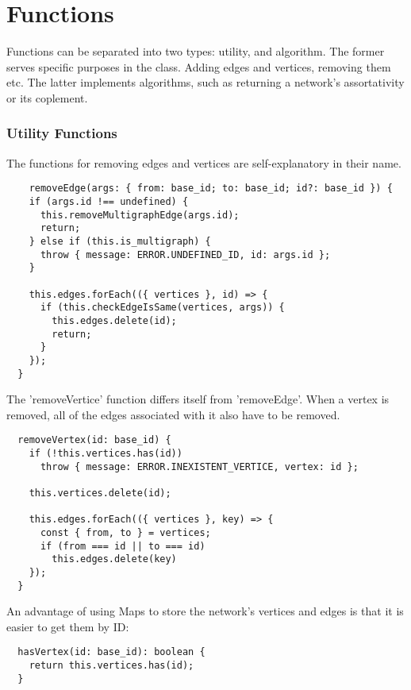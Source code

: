 \chapter{Functions}

Functions can be separated into two types: utility, and algorithm.
The former serves specific purposes in the class. Adding edges and vertices, removing them etc.
The latter implements algorithms, such as returning a network's assortativity or its coplement.

\subsection{Utility Functions}
The functions for removing edges and vertices are self-explanatory in their name.

\begin{verbatim}
    removeEdge(args: { from: base_id; to: base_id; id?: base_id }) {
    if (args.id !== undefined) {
      this.removeMultigraphEdge(args.id);
      return;
    } else if (this.is_multigraph) {
      throw { message: ERROR.UNDEFINED_ID, id: args.id };
    }

    this.edges.forEach(({ vertices }, id) => {
      if (this.checkEdgeIsSame(vertices, args)) {
        this.edges.delete(id);
        return;
      }
    });
  }
\end{verbatim}

The 'removeVertice' function differs itself from 'removeEdge'.
When a vertex is removed, all of the edges associated with it also have to be removed.

\begin{verbatim}
  removeVertex(id: base_id) {
    if (!this.vertices.has(id))
      throw { message: ERROR.INEXISTENT_VERTICE, vertex: id };

    this.vertices.delete(id);

    this.edges.forEach(({ vertices }, key) => {
      const { from, to } = vertices;
      if (from === id || to === id)
        this.edges.delete(key)
    });
  }
\end{verbatim}

An advantage of using Maps to store the network's vertices and edges is that it is easier to get them by ID:

\begin{verbatim}
  hasVertex(id: base_id): boolean {
    return this.vertices.has(id);
  }
\end{verbatim}

